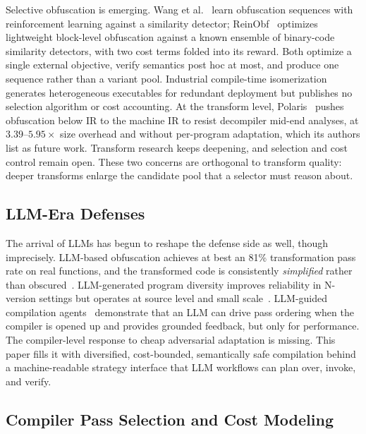 \documentclass[pdflatex,sn-mathphys-num]{sn-jnl}
\theoremstyle{thmstyleone}%
\theoremstyle{thmstyletwo}%
\theoremstyle{thmstylethree}%
\begin{document}
Selective obfuscation is emerging. Wang et al.~\cite{bib4} learn obfuscation sequences
with reinforcement learning against a similarity detector; ReinObf~\cite{wei2025reinobf}
optimizes lightweight block-level obfuscation against a known ensemble of binary-code
similarity detectors, with two cost terms folded into its reward. Both optimize a
single external objective, verify semantics post hoc at most, and produce one sequence
rather than a variant pool. Industrial compile-time isomerization~\cite{he2024isomerization}
generates heterogeneous executables for redundant deployment but publishes no
selection algorithm or cost accounting. At the transform level,
Polaris~\cite{zhou2026polaris} pushes obfuscation below IR to the machine IR to resist
decompiler mid-end analyses, at $3.39$--$5.95\times$ size overhead and without
per-program adaptation, which its authors list as future work. Transform research
keeps deepening, and selection and cost control remain open. These two concerns are
orthogonal to transform quality: deeper transforms enlarge the candidate pool that a
selector must reason about.

\subsection{LLM-Era Defenses}

The arrival of LLMs has begun to reshape the defense side as well, though
imprecisely. LLM-based obfuscation achieves at best an 81\% transformation
pass rate on real functions, and the transformed code is consistently
\emph{simplified} rather than obscured~\cite{detomasi2025simplicity}.
LLM-generated program diversity improves reliability in N-version settings
but operates at source level and small scale~\cite{ron2026galapagos}.
LLM-guided compilation agents~\cite{li2026autopass} demonstrate that an LLM
can drive pass ordering when the compiler is opened up and provides grounded
feedback, but only for performance. The compiler-level response to cheap
adversarial adaptation is missing. This paper fills it with diversified,
cost-bounded, semantically safe compilation behind a machine-readable
strategy interface that LLM workflows can plan over, invoke, and verify.

\subsection{Compiler Pass Selection and Cost Modeling}
\end{document}
